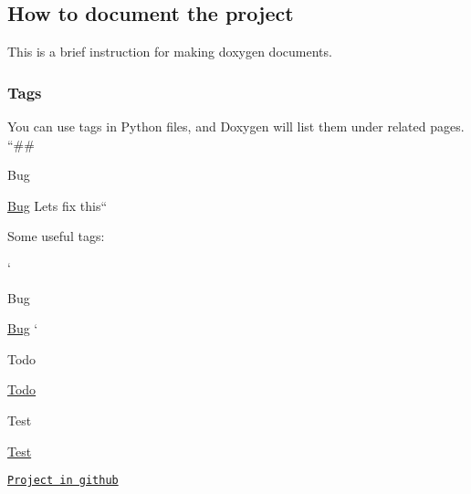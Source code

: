 \subsection*{How to document the project}

This is a brief instruction for making doxygen documents.

\subsubsection*{Tags}

You can use tags in Python files, and Doxygen will list them under related pages. ``\#\#\begin{DoxyRefDesc}{Bug}
\item[\hyperlink{bug__bug000001}{Bug}]Lets fix this`` \end{DoxyRefDesc}


Some useful tags\+:
\begin{DoxyItemize}
\item `\begin{DoxyRefDesc}{Bug}
\item[\hyperlink{bug__bug000002}{Bug}]`\end{DoxyRefDesc}
\begin{DoxyRefDesc}{Todo}
\item[\hyperlink{todo__todo000001}{Todo}]\end{DoxyRefDesc}
\begin{DoxyRefDesc}{Test}
\item[\hyperlink{test__test000001}{Test}]\end{DoxyRefDesc}

\end{DoxyItemize}

\href{https://github.com/Konenako/Ohtuprojekti-kesa2020}{\tt Project in github} 